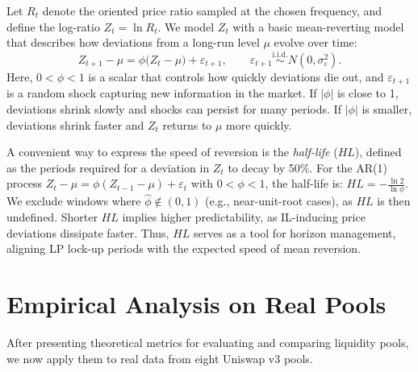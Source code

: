 \documentclass[journal]{IEEEtran}
\begin{document}
Let \(R_t\) denote the oriented price ratio sampled at the chosen frequency, and define the log-ratio \(Z_t = \ln R_t\).
We model \(Z_t\) with a basic mean-reverting model that describes how deviations from a long-run level \(\mu\) evolve over time:
\begin{equation}
\label{eq:ar1_ratio}
Z_{t+1} - \mu = \phi \bigl(Z_t - \mu\bigr) + \varepsilon_{t+1}, 
\qquad \varepsilon_{t+1} \stackrel{\mathrm{i.i.d.}}{\sim} N(0, \sigma^2_\varepsilon).
\end{equation}
Here, $0<\phi<1$ is a scalar that controls how quickly deviations die out, and \(\varepsilon_{t+1}\) is a random shock capturing new information in the market.
If \(|\phi|\) is close to 1, deviations shrink slowly and shocks can persist for many periods.
If \(|\phi|\) is smaller, deviations shrink faster and \(Z_t\) returns to \(\mu\) more quickly.


A convenient way to express the speed of reversion is the \emph{half-life} ($HL$), defined as the periods required for a deviation in $Z_t$ to decay by 50\%. For the AR(1) process $Z_t-\mu = \phi(Z_{t-1}-\mu)+\varepsilon_t$ with $0<\phi<1$, the half-life is:
\(
    HL = -\frac{\ln 2}{\ln \phi}.
\)
We exclude windows where $\hat{\phi} \notin (0,1)$ (e.g., near-unit-root cases), as $HL$ is then undefined. Shorter $HL$ implies higher predictability, as IL-inducing price deviations dissipate faster. Thus, $HL$ serves as a tool for horizon management, aligning LP lock-up periods with the expected speed of mean reversion.


\section{Empirical Analysis on Real Pools}
\label{sec:empirical_analysis}

After presenting theoretical metrics for evaluating and comparing liquidity pools, we now apply them to real data from eight Uniswap v3 pools.
\end{document}
